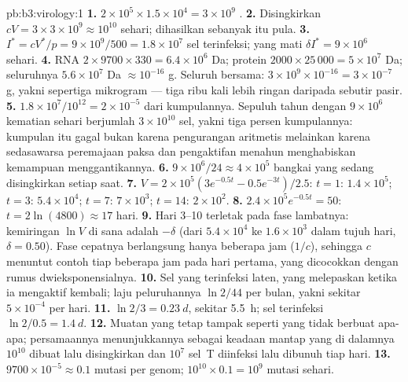 \begin{solution}{pb:b3:virology:1}
\textbf{1.} $2\times 10^{5}\times 1.5\times 10^{4} = 3\times 10^{9}$
.
\textbf{2.} Disingkirkan $cV = 3\times 3\times 10^{9} \approx 10^{10}$ sehari;
dihasilkan sebanyak itu pula.
\textbf{3.} $I^{*} = cV^{*}/p = 9\times 10^{9}/500 = 1.8\times 10^{7}$
sel terinfeksi; yang mati $\delta I^{*} = 9\times 10^{6}$ sehari.
\textbf{4.} RNA $2\times 9700\times 330 = 6.4\times 10^{6}$ Da; protein
$2000\times 25\,000 = 5\times 10^{7}$ Da; seluruhnya $5.6\times 10^{7}$ Da
$\approx 10^{-16}$ g. Seluruh  bersama: $3\times 10^{9}\times
10^{-16} = 3\times 10^{-7}$ g, yakni sepertiga mikrogram --- tiga
ribu kali lebih ringan daripada sebutir pasir.
\textbf{5.} $1.8\times 10^{7}/10^{12} = 2\times 10^{-5}$ dari kumpulannya.
Sepuluh tahun dengan $9\times 10^{6}$ kematian sehari berjumlah
$3\times 10^{10}$ sel, yakni tiga persen kumpulannya: kumpulan itu gagal
bukan karena pengurangan aritmetis melainkan karena sedasawarsa peremajaan
paksa dan pengaktifan menahun menghabiskan kemampuan menggantikannya.
\textbf{6.} $9\times 10^{6}/24 \approx 4\times 10^{5}$ bangkai yang sedang
disingkirkan setiap saat.
\textbf{7.} $V = 2\times 10^{5}(3e^{-0.5t} - 0.5e^{-3t})/2.5$: $t = 1$:
$1.4\times 10^{5}$; $t = 3$: $5.4\times 10^{4}$; $t = 7$: $7\times
10^{3}$; $t = 14$: $2\times 10^{2}$.
\textbf{8.} $2.4\times 10^{5}e^{-0.5t} = 50$: $t = 2\ln(4800) \approx 17$
hari.
\textbf{9.} Hari 3--10 terletak pada fase lambatnya: kemiringan $\ln V$ di
sana adalah $-\delta$ (dari $5.4\times 10^{4}$ ke $1.6\times 10^{3}$ dalam
tujuh hari, $\delta = 0.50$). Fase cepatnya berlangsung hanya beberapa jam
($1/c$), sehingga $c$ menuntut contoh tiap beberapa jam pada hari pertama,
yang dicocokkan dengan rumus dwieksponensialnya.
\textbf{10.} Sel yang terinfeksi laten, yang melepaskan  ketika ia
mengaktif kembali; laju peluruhannya $\ln 2/44$ per bulan, yakni sekitar
$5\times 10^{-4}$ per hari.
\textbf{11.}  $\ln 2/3 = \qty{0.23}{d}$, sekitar \qty{5.5}{h}; sel
terinfeksi $\ln 2/0.5 = \qty{1.4}{d}$.
\textbf{12.} Muatan yang tetap tampak seperti  yang tidak berbuat apa-apa;
persamaannya menunjukkannya sebagai keadaan mantap yang di dalamnya $10^{10}$
 dibuat lalu disingkirkan dan $10^{7}$ sel~T diinfeksi lalu dibunuh
tiap hari.
\textbf{13.} $9700\times 10^{-5} \approx 0.1$ mutasi per genom;
$10^{10}\times 0.1 = 10^{9}$ mutasi sehari.

\end{solution}
